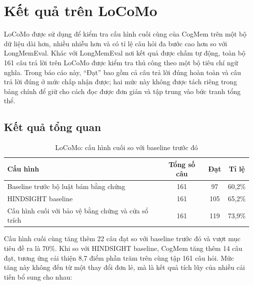 \documentclass[../main.tex]{subfiles}
\begin{document}
\section{Kết quả trên LoCoMo}

LoCoMo được sử dụng để kiểm tra cấu hình cuối cùng của CogMem trên một bộ dữ liệu dài hơn, nhiều nhiễu hơn và có tỉ lệ câu hỏi đa bước cao hơn so với LongMemEval. Khác với LongMemEval nơi kết quả được chấm tự động, toàn bộ 161 câu trả lời trên LoCoMo được kiểm tra thủ công theo một bộ tiêu chí ngữ nghĩa. Trong báo cáo này, ``Đạt'' bao gồm cả câu trả lời đúng hoàn toàn và câu trả lời đúng ở mức chấp nhận được; hai mức này không được tách riêng trong bảng chính để giữ cho cách đọc được đơn giản và tập trung vào bức tranh tổng thể.

\subsection{Kết quả tổng quan}

\begin{table}[H]
\centering
\caption{LoCoMo: cấu hình cuối so với baseline trước đó}
\label{tab:locomo_full_accuracy}
\small
\begin{tabularx}{\linewidth}{@{}p{7.5cm}ccc@{}}
\toprule
\textbf{Cấu hình} & \textbf{Tổng số câu} & \textbf{Đạt} & \textbf{Tỉ lệ} \\
\midrule
Baseline trước bộ luật bám bằng chứng & 161 & 97 & 60,2\% \\
HINDSIGHT baseline & 161 & 105 & 65,2\% \\
Cấu hình cuối với bảo vệ bằng chứng và cửa sổ trích & 161 & 119 & 73,9\% \\
\bottomrule
\end{tabularx}
\end{table}

Cấu hình cuối cùng tăng thêm 22 câu đạt so với baseline trước đó và vượt mục tiêu đề ra là 70\%. Khi so với HINDSIGHT baseline, CogMem tăng thêm 14 câu đạt, tương ứng cải thiện 8,7 điểm phần trăm trên cùng tập 161 câu hỏi. Mức tăng này không đến từ một thay đổi đơn lẻ, mà là kết quả tích lũy của nhiều cải tiến bổ sung cho nhau:
\end{document}
